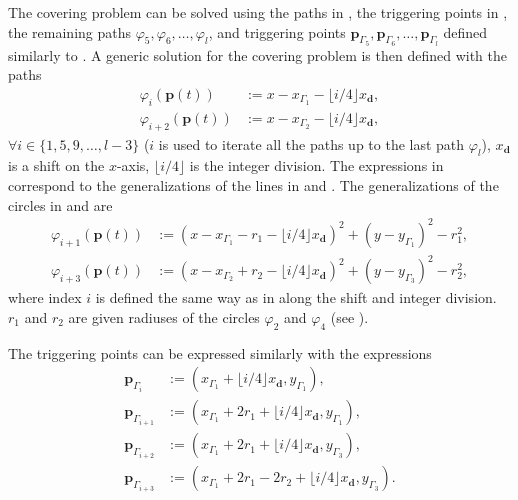 The covering problem can be solved using the paths in , the triggering points in , the remaining paths $\varphi_5,\varphi_6,\dots,\varphi_l$, and triggering points $\mathbf{p}_{\Gamma_5},\mathbf{p}_{\Gamma_6},\dots,\mathbf{p}_{\Gamma_l}$ defined similarly to . A generic solution for the covering problem is then defined with the paths
\begin{subequations}\label{eq:line-gene}\begin{align}
  \varphi_i(\mathbf{p}(t))&:=x-x_{\Gamma_1}-\lfloor i/4\rfloor x_\mathbf{d},\\
  \varphi_{i+2}(\mathbf{p}(t))&:=x-x_{\Gamma_2}-\lfloor i/4\rfloor x_\mathbf{d},
\end{align}
\end{subequations}
$\forall i\in\{1,5,9,\dots,l-3\}$ ($i$ is used to iterate all the paths up to the last path $\varphi_l$), $x_\mathbf{d}$ is a shift on the $x$-axis, $\lfloor i/4\rfloor$ is the integer division. The expressions in  correspond to the generalizations of the lines in  and . The generalizations of the circles in  and  are
\begin{subequations}\label{eq:circ-gene}\begin{align}
  \varphi_{i+1}(\mathbf{p}(t))&:=(x-x_{\Gamma_1}-r_1-\lfloor i/4\rfloor x_\mathbf{d})^2+(y-y_{\Gamma_1})^2-r_1^2,\\
  \varphi_{i+3}(\mathbf{p}(t))&:=(x-x_{\Gamma_2}+r_2-\lfloor i/4\rfloor x_\mathbf{d})^2+(y-y_{\Gamma_3})^2-r_2^2,\label{eq:second-circ-gene}
\end{align}
\end{subequations}
where index $i$ is defined the same way as in  along the shift and integer division. $r_1$ and $r_2$ are given radiuses of the circles $\varphi_2$ and $\varphi_4$ (see ).

The triggering points can be expressed similarly with the expressions
\begin{subequations}\label{eq:trigs-gene}\begin{align}
  \mathbf{p}_{\Gamma_i}&:=(x_{\Gamma_1}+\lfloor i/4\rfloor x_\mathbf{d},y_{\Gamma_1}),\\
  \mathbf{p}_{\Gamma_{i+1}}&:=(x_{\Gamma_1}+2r_1+\lfloor i/4\rfloor x_\mathbf{d},y_{\Gamma_1}),\\
  \mathbf{p}_{\Gamma_{i+2}}&:=(x_{\Gamma_1}+2r_1+\lfloor i/4\rfloor x_\mathbf{d},y_{\Gamma_3}),\\
  \mathbf{p}_{\Gamma_{i+3}}&:=(x_{\Gamma_1}+2r_1-2r_2+\lfloor i/4\rfloor x_\mathbf{d},y_{\Gamma_3})\label{eq:last-trig-gene}.
\end{align}
\end{subequations}

